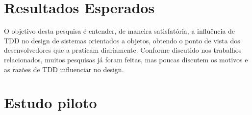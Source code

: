 \section{Resultados Esperados}
\label{sec:planejamento-resultados-esperados}

O objetivo desta pesquisa é entender, de maneira satisfatória, a influência de 
TDD no design de sistemas orientados a objetos, obtendo o ponto de vista dos 
desenvolvedores que a praticam diariamente. Conforme discutido nos trabalhos 
relacionados, muitos pesquisas já foram feitas, mas poucas discutem os motivos 
e as razões de TDD influenciar no design.

\section{Estudo piloto}

